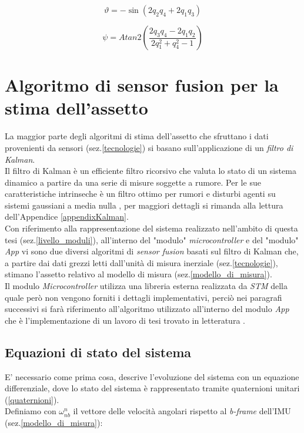 \begin{equation}
\vartheta = -\sin(2q_2q_4 + 2q_1q_3)
\end{equation}

\begin{equation}
\psi = Atan2\left(  \frac{2q_3 q_4 - 2q_1q_2}{2q_1^2+q_4^2 -1}\right)
\end{equation}


\section{Algoritmo di sensor fusion per la stima dell'assetto}
\label{sensor_fusion}
La maggior parte degli algoritmi di stima dell'assetto che sfruttano i dati provenienti da sensori (sez.\ref{tecnologie}) si basano sull'applicazione di un \textit{filtro di Kalman}.\\
Il filtro di Kalman è un efficiente filtro ricorsivo che valuta lo stato di un sistema dinamico a partire da una serie di misure soggette a rumore. Per le sue caratteristiche intrinseche è un filtro ottimo per rumori e disturbi agenti su sistemi gaussiani a media nulla \cite{kalmanWiki}, per maggiori dettagli si rimanda alla lettura dell'Appendice \ref{appendixKalman}.\\
Con riferimento alla rappresentazione del sistema realizzato nell'ambito di questa tesi (sez.\ref{livello_moduli}), all'interno del "modulo" \textit{microcontroller} e del "modulo" \textit{App} vi sono due diversi algoritmi di \textit{sensor fusion} basati sul filtro di Kalman che, a partire dai dati grezzi letti dall'unità di misura inerziale (sez.\ref{tecnologie}), stimano l'assetto relativo al modello di misura (sez.\ref{modello_di_misura}).\\
Il modulo \textit{Microcontroller} utilizza una libreria esterna realizzata da \textit{STM} \cite{motion} della quale però non vengono forniti i dettagli implementativi, perciò nei paragrafi successivi si farà riferimento all'algoritmo utilizzato all'interno del modulo \textit{App} che è  l'implementazione di un lavoro di tesi trovato in letteratura \cite{trackingThesis}.

\subsection{Equazioni di stato del sistema}

 E' necessario come prima cosa, descrive l'evoluzione del sistema con un equazione differenziale, dove lo stato del sistema è rappresentato tramite quaternioni unitari (\ref{quaternioni}).\\
 Definiamo con $\omega_{nb}^n$ il vettore delle velocità angolari rispetto al \textit{b-frame} dell'IMU (sez.\ref{modello_di_misura}):
 
